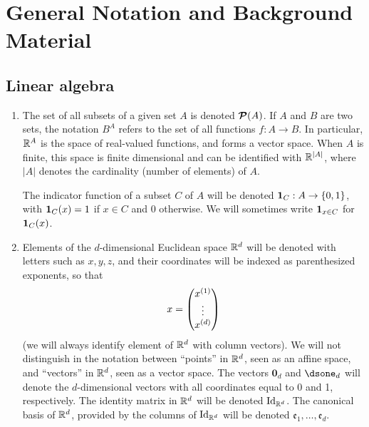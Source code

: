 \chapter{General Notation and Background Material}

\section{Linear algebra}
\begin{enumerate}[label={\bf \arabic*.}]

\item The set of all subsets of a given set $A$ is denoted ${\bm{\mathcal P}({A})}$.
If $A$ and $B$ are two sets, the notation $B^A$ refers to the set of all functions $f:A\to B$. In particular, ${\mathbb{R}}^A$ is the space of real-valued functions, and forms a vector space. When $A$ is finite, this space is finite dimensional and can be identified with ${\mathbb{R}}^{|A|}$, where $|A|$ denotes the cardinality (number of elements) of $A$.

The indicator function of a subset $C$ of $A$ will be denoted ${\bm 1}_C: A \to \{0,1\}$, with ${\bm 1}_C(x) = 1$ if $x\in C$ and 0 otherwise. We will sometimes write ${\bm 1}_{x\in C}$ for ${\bm 1}_C(x)$.


\item
Elements of the $d$-dimensional Euclidean space ${\mathbb{R}}^d$ will be denoted with letters such as $x,y,z$, and their coordinates will be indexed as parenthesized exponents, so that
\[
 x = \begin{pmatrix}
 x^{(1)}\\
 \vdots
 \\
 x^{(d)}
 \end{pmatrix}
 \]
 (we will always  identify element of ${\mathbb{R}}^d$ with column vectors). We will not distinguish in the notation between ``points'' in  ${\mathbb{R}}^d$, seen as an  affine space, and ``vectors'' in  ${\mathbb{R}}^d$, seen as a vector space. The vectors ${\mathbf 0}_d$ and $\dsone_d$ will denote the $d$-dimensional vectors with all coordinates equal to 0 and 1, respectively. 
 The identity matrix in ${\mathbb{R}}^d$ will be denoted $\Id[d]$. The canonical basis of ${\mathbb{R}}^d$, provided by the columns of $\Id[d]$ will be denoted $\mathfrak e_1, \ldots, \mathfrak e_d$. 
 

\end{enumerate}
